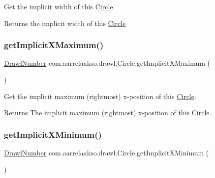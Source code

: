 Get the implicit width of this \hyperlink{classcom_1_1aarrelaakso_1_1drawl_1_1_circle}{Circle}. 

\begin{DoxyReturn}{Returns}
the implicit width of this \hyperlink{classcom_1_1aarrelaakso_1_1drawl_1_1_circle}{Circle} 
\end{DoxyReturn}
\mbox{\label{classcom_1_1aarrelaakso_1_1drawl_1_1_circle_a9f611727bb4828ab95c9c1c7059f5c6d}} 
\subsubsection{\texorpdfstring{get\+Implicit\+X\+Maximum()}{getImplicitXMaximum()}}
{\footnotesize\ttfamily \hyperlink{classcom_1_1aarrelaakso_1_1drawl_1_1_drawl_number}{Drawl\+Number} com.\+aarrelaakso.\+drawl.\+Circle.\+get\+Implicit\+X\+Maximum (\begin{DoxyParamCaption}{ }\end{DoxyParamCaption})\hspace{0.3cm}{\ttfamily [protected]}}



Get the implicit maximum (rightmost) x-\/position of this \hyperlink{classcom_1_1aarrelaakso_1_1drawl_1_1_circle}{Circle}. 

\begin{DoxyReturn}{Returns}
The implicit maximum (rightmost) x-\/position of this \hyperlink{classcom_1_1aarrelaakso_1_1drawl_1_1_circle}{Circle}. 
\end{DoxyReturn}
\mbox{\label{classcom_1_1aarrelaakso_1_1drawl_1_1_circle_a592ebc277b29fc55879799f7ea195a79}} 
\subsubsection{\texorpdfstring{get\+Implicit\+X\+Minimum()}{getImplicitXMinimum()}}
{\footnotesize\ttfamily \hyperlink{classcom_1_1aarrelaakso_1_1drawl_1_1_drawl_number}{Drawl\+Number} com.\+aarrelaakso.\+drawl.\+Circle.\+get\+Implicit\+X\+Minimum (\begin{DoxyParamCaption}{ }\end{DoxyParamCaption})\hspace{0.3cm}{\ttfamily [protected]}}



